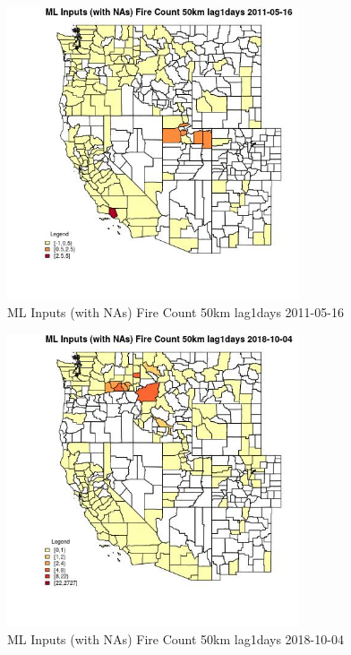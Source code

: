 \begin{figure} 
\centering  
\includegraphics[width=0.77\textwidth]{Code_Outputs/Report_ML_input_PM25_Step4_part_f_de_duplicated_aveswNAs_CountyFire_Count_50km_lag1daysMean2011-05-16.jpg} 
\caption{\label{fig:Report_ML_input_PM25_Step4_part_f_de_duplicated_aveswNAsCountyFire_Count_50km_lag1daysMean2011-05-16}ML Inputs (with NAs) Fire Count 50km lag1days 2011-05-16} 
\end{figure} 
 

\begin{figure} 
\centering  
\includegraphics[width=0.77\textwidth]{Code_Outputs/Report_ML_input_PM25_Step4_part_f_de_duplicated_aveswNAs_CountyFire_Count_50km_lag1daysMean2018-10-04.jpg} 
\caption{\label{fig:Report_ML_input_PM25_Step4_part_f_de_duplicated_aveswNAsCountyFire_Count_50km_lag1daysMean2018-10-04}ML Inputs (with NAs) Fire Count 50km lag1days 2018-10-04} 
\end{figure} 
 

